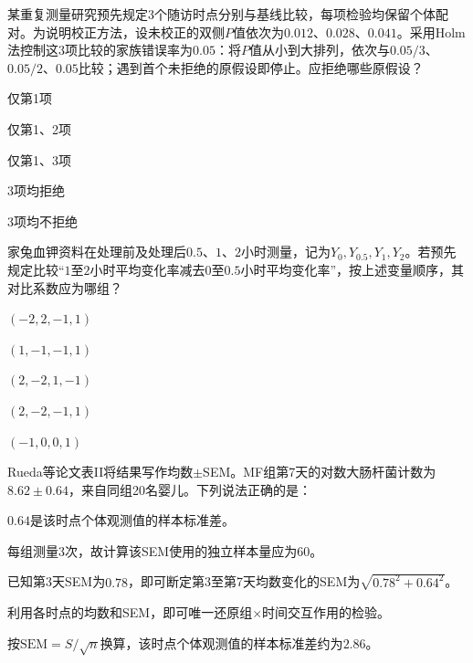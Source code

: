 \par\noindent\begin{minipage}{\linewidth}
某重复测量研究预先规定3个随访时点分别与基线比较，每项检验均保留个体配对。为说明校正方法，设未校正的双侧$P$值依次为$0.012$、$0.028$、$0.041$。采用Holm法控制这3项比较的家族错误率为$0.05$：将$P$值从小到大排列，依次与$0.05/3$、$0.05/2$、$0.05$比较；遇到首个未拒绝的原假设即停止。应拒绝哪些原假设？
\begin{choices}
\item 仅第1项
\item 仅第1、2项
\item 仅第1、3项
\item 3项均拒绝
\item 3项均不拒绝
\end{choices}
\end{minipage}\par\medskip

\par\noindent\begin{minipage}{\linewidth}
家兔血钾资料在处理前及处理后$0.5$、$1$、$2$小时测量，记为$Y_0,Y_{0.5},Y_1,Y_2$。若预先规定比较“$1$至$2$小时平均变化率减去$0$至$0.5$小时平均变化率”，按上述变量顺序，其对比系数应为哪组？
\begin{choices}
\item $(-2,2,-1,1)$
\item $(1,-1,-1,1)$
\item $(2,-2,1,-1)$
\item $(2,-2,-1,1)$
\item $(-1,0,0,1)$
\end{choices}
\end{minipage}\par\medskip

\par\noindent\begin{minipage}{\linewidth}
Rueda等论文表II将结果写作均数$\pm$SEM。MF组第7天的对数大肠杆菌计数为$8.62\pm0.64$，来自同组20名婴儿。下列说法正确的是：
\begin{choices}
\item $0.64$是该时点个体观测值的样本标准差。
\item 每组测量3次，故计算该SEM使用的独立样本量应为60。
\item 已知第3天SEM为$0.78$，即可断定第3至第7天均数变化的SEM为$\sqrt{0.78^2+0.64^2}$。
\item 利用各时点的均数和SEM，即可唯一还原组$\times$时间交互作用的检验。
\item 按$\mathrm{SEM}=S/\sqrt n$换算，该时点个体观测值的样本标准差约为$2.86$。
\end{choices}
\end{minipage}\par\medskip

